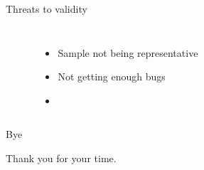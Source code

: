\documentclass[mathserif,serif]{beamer}
\newenvironment{items}{
\begin{itemize}
  \setlength{\itemsep}{0pt}
  \setlength{\parskip}{7pt}
  \setlength{\parsep}{4pt}
}{\end{itemize}}
\begin{document}
\begin{frame}[t,fragile]{Threats to validity}

    \begin{columns}[T]

    \begin{Verbatim}
    
    \end{Verbatim}


    \begin{items}
        \item Sample not being representative
        \item Not getting enough bugs
        \pause
        \item \color{red}{Can you think of more?}
    \end{items}

    \end{columns}
\end{frame}

\begin{frame}[t]{Bye}
    \begin{center}
        Thank you for your time.
    \end{center}
\end{frame}
\end{document}
